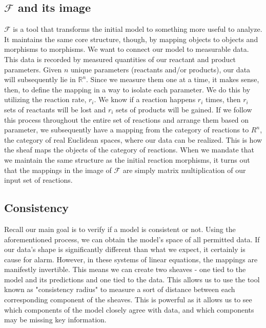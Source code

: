 \documentclass[10.5pt]{article}
\begin{document}
\subsection{$\mathscr{F}$ and its image}
$\mathscr{F}$ is a tool that transforms the initial model to something more useful to analyze. It maintains the same core structure, though, by mapping objects to objects and morphisms to morphisms. 
We want to connect our model to measurable data. This data is recorded by measured quantities of our reactant and product parameters. Given $n$ unique parameters (reactants and/or products), our data will subsequently lie in $\mathbb{R}^n$. Since we measure them one at a time, it makes sense, then, to define the mapping in a way to isolate each parameter. We do this by utilizing the reaction rate, $r_i$. We know if a reaction happens $r_i$ times, then $r_i$ sets of reactants will be lost and $r_i$ sets of products will be gained. If we follow this process throughout the entire set of reactions and arrange them based on parameter, we subsequently have a mapping from the category of reactions to $R^n$, the category of real Euclidean spaces, where our data can be realized. This is how the sheaf maps the objects of the category of reactions. When we mandate that we maintain the same structure as the initial reaction morphisms, it turns out that the mappings in the image of $\mathscr{F}$ are simply matrix multiplication of our input set of reactions.
\subsection{Consistency}
Recall our main goal is to verify if a model is consistent or not. Using the aforementioned process, we can obtain the model's space of all permitted data. If our data's shape is significantly different than what we expect, it certainly is cause for alarm. However, in these systems of linear equations, the mappings are manifestly invertible. This means we can create two sheaves - one tied to the model and its predictions and one tied to the data. This allows us to use the tool known as "consistency radius" to measure a sort of distance between each corresponding component of the sheaves. This is powerful as it allows us to see which components of the model closely agree with data, and which components may be missing key information.
\end{document}
